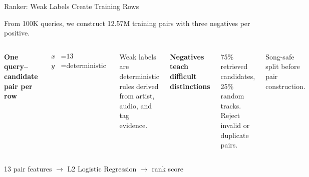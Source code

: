 \documentclass{beamer}
\begin{document}
\begin{frame}{Ranker: Weak Labels Create Training Rows}

\small From 100K queries, we construct 12.57M training pairs with three negatives per positive.

\vspace{.35cm}
\begin{columns}[T,onlytextwidth]
  \textbf{One query--candidate pair per row}

  \small
  \begin{align*}
    x &= \text{13 standardized pair features} \\
    y &= \text{deterministic weak-positive label}
  \end{align*}

  \vspace{-.18cm}
  \small Weak labels are deterministic rules derived from artist, audio, and tag evidence.

  \textbf{Negatives teach difficult distinctions}

  \small 75\% retrieved candidates, 25\% random tracks. Reject invalid or duplicate pairs.

  \vspace{.22cm}
  \small Song-safe split before pair construction.
\end{columns}

\vfill
\begin{center}
  \small 13 pair features $\longrightarrow$ L2 Logistic Regression $\longrightarrow$ rank score \autocite{cox1958regression}
\end{center}

\end{frame}
\end{document}
